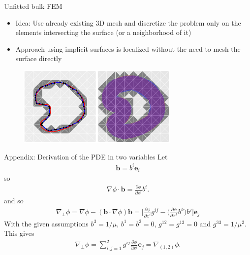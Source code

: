 \documentclass[
	english,%
	logo=false,%
	eurofusion=false, %
	titlegraphic=true, %
	]{ippbeamer}
\begin{document}
\begin{frame}{Unfitted bulk FEM}
	\small 
	\begin{itemize}
		\item Idea: Use already existing 3D mesh and discretize the 
			problem only on the elements intersecting the surface (or a neighborhood of it)
		\item Approach using implicit surfaces
			is localized without the need to mesh the surface directly
	\end{itemize}
	\begin{figure}
		\centering	
		\includegraphics[width=0.7\textwidth]{unfitted_bulk_method_mesh.png}
	\end{figure}
\end{frame}

\begin{frame}{Appendix: Derivation of the PDE in two variables}
	Let 
	\begin{align*}
		\mathbf{b} = b^i \mathbf{e}_i
	\end{align*}
	so 
	\begin{align*}
		\nabla \phi \cdot \mathbf{b} = \frac{\partial \phi}{\partial x^i} b^i.
	\end{align*}
	and so 
	\begin{align*}
		\nabla_\perp \phi = \nabla \phi - (\mathbf{b} \cdot \nabla \phi) \mathbf{b}
		= \bigg[ \frac{\partial \phi}{\partial x^i} g^{ij} 
			- \bigg( \frac{\partial \phi}{\partial x^k} b^k \bigg) b^j \bigg] \mathbf{e}_j
	\end{align*}
	With the given assumptions $b^3 = 1/\mu$, $b^1 = b^2 = 0$, 
	$g^{12} = g^{13} = 0$ and $g^{33} = 1/\mu^2$. This gives 
	\begin{align*}
		\nabla_\perp \phi = \sum_{i,j=1}^{2} g^{ij} \frac{\partial \phi}{\partial x^i}  \mathbf{e}_j
			= \nabla_{(1,2)} \phi.
	\end{align*}
\end{frame}
\end{document}
